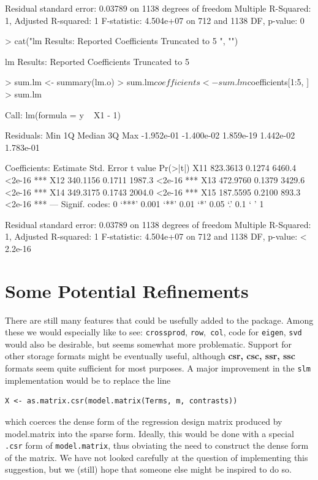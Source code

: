 \documentclass{article}
\begin{document}
\begin{Schunk}
\begin{Soutput}
Residual standard error: 0.03789 on 1138 degrees of freedom
Multiple R-Squared:     1,	Adjusted R-squared:     1 
F-statistic: 4.504e+07 on 712 and 1138 DF,	p-value:     0 
\end{Soutput}
\begin{Sinput}
> cat("lm Results: Reported Coefficients Truncated to 5  ", "\n")
\end{Sinput}
\begin{Soutput}
lm Results: Reported Coefficients Truncated to 5   
\end{Soutput}
\begin{Sinput}
> sum.lm <- summary(lm.o)
> sum.lm$coefficients <- sum.lm$coefficients[1:5, ]
> sum.lm
\end{Sinput}
\begin{Soutput}
Call:
lm(formula = y ~ X1 - 1)

Residuals:
       Min         1Q     Median         3Q        Max 
-1.952e-01 -1.400e-02  1.859e-19  1.442e-02  1.783e-01 

Coefficients:
    Estimate Std. Error t value Pr(>|t|)    
X11 823.3613     0.1274  6460.4   <2e-16 ***
X12 340.1156     0.1711  1987.3   <2e-16 ***
X13 472.9760     0.1379  3429.6   <2e-16 ***
X14 349.3175     0.1743  2004.0   <2e-16 ***
X15 187.5595     0.2100   893.3   <2e-16 ***
---
Signif. codes:  0 `***' 0.001 `**' 0.01 `*' 0.05 `.' 0.1 ` ' 1 

Residual standard error: 0.03789 on 1138 degrees of freedom
Multiple R-Squared:     1,	Adjusted R-squared:     1 
F-statistic: 4.504e+07 on 712 and 1138 DF,  p-value: < 2.2e-16 
\end{Soutput}
\end{Schunk}


\section{Some Potential Refinements}

There are still many features that could be usefully added to the package. Among these
we would especially like to see: \texttt{crossprod},
\texttt{row},\texttt{ col}, code for \texttt{eigen}, \texttt{svd}
would also be desirable, but seems somewhat more problematic.
Support for other storage formats might
be eventually useful, although \textbf{csr, csc, ssr, ssc} formats seem quite
sufficient for most purposes. A major improvement in the \texttt{slm}
implementation would be to replace the line
\begin{verbatim}
X <- as.matrix.csr(model.matrix(Terms, m, contrasts))
\end{verbatim}
which coerces the dense form of the regression design matrix produced by
model.matrix into the sparse form. Ideally, this would be done with a special 
\texttt{.csr} form of
\texttt{model.matrix}, thus obviating the need to construct the dense form
of the matrix. We have not looked carefully at the question of implementing
this suggestion, but we (still) hope that someone else might be inspired to do so.
\end{document}
